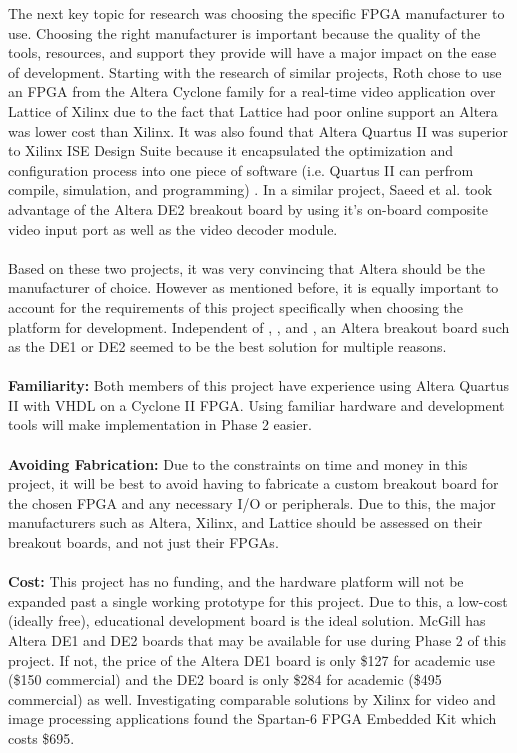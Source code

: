 \documentclass[11pt]{article} %
\begin{document}
The next key topic for research was choosing the specific FPGA manufacturer to use. Choosing the right manufacturer is important because the quality of the tools, resources, and support they provide will have a major impact on the ease of development. Starting with the research of similar projects, Roth \cite{1} chose to use an FPGA from the Altera Cyclone family for a real-time video application over Lattice of Xilinx due to the fact that Lattice had poor online support an Altera was lower cost than Xilinx. It was also found that Altera Quartus II was superior to Xilinx ISE Design Suite because it encapsulated the optimization and configuration process into one piece of software (i.e. Quartus II can perfrom compile, simulation, and programming) \cite{1}. In a similar project, Saeed et al. \cite{2} took advantage of the Altera DE2 breakout board by using it's on-board composite video input port as well as the video decoder module. \\\\
Based on these two projects, it was very convincing that Altera should be the manufacturer of choice. However as mentioned before, it is equally important to account for the requirements of this project specifically when choosing the platform for development. Independent of \cite{1}, \cite{2}, and \cite{3}, an Altera breakout board such as the DE1 or DE2 seemed to be the best solution for multiple reasons. \\\\
\textbf{Familiarity:} Both members of this project have experience using Altera Quartus II with VHDL on a Cyclone II FPGA. Using familiar hardware and development tools will make implementation in Phase 2 easier. \\\\
\textbf{Avoiding Fabrication:} Due to the constraints on time and money in this project, it will be best to avoid having to fabricate a custom breakout board for the chosen FPGA and any necessary I/O or peripherals. Due to this, the major manufacturers such as Altera, Xilinx, and Lattice should be assessed on their breakout boards, and not just their FPGAs.\\\\
\textbf{Cost:} This project has no funding, and the hardware platform will not be expanded past a single working prototype for this project. Due to this, a low-cost (ideally free), educational development board is the ideal solution. McGill has Altera DE1 and DE2 boards that may be available for use during Phase 2 of this project. If not, the price of the Altera DE1 board is only \$127 for academic use (\$150 commercial) and the DE2 board is only \$284 for academic (\$495 commercial) as well. Investigating comparable solutions by Xilinx for video and image processing applications found the Spartan-6 FPGA Embedded Kit which costs \$695.
\end{document}
